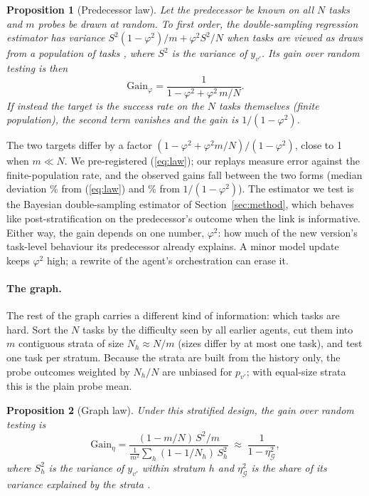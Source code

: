 \documentclass[11pt]{article}
\newtheorem{proposition}{Proposition}
\newcommand{\phisq}{\varphi^2}
\begin{document}
\begin{proposition}[Predecessor law]\label{prop:phi}
Let the predecessor be known on all $N$ tasks and $m$ probes be drawn at random. To first order, the double-sampling
regression estimator has variance $S^2(1-\phisq)/m + \phisq S^2/N$ when tasks are viewed as draws from a
population of tasks \citep[ch.~12]{cochran1977}, where $S^2$ is the variance of $y_{v'}$. Its gain over random
testing is then
\begin{equation}\label{eq:law}
\mathrm{Gain}_{\varphi} = \frac{1}{1-\phisq+\phisq\, m/N}.
\end{equation}
If instead the target is the success rate on the $N$ tasks themselves (finite population), the second term vanishes and
the gain is $1/(1-\phisq)$.
\end{proposition}
The two targets differ by a factor $(1-\phisq+\phisq m/N)/(1-\phisq)$, close to 1 when $m\ll N$. We pre-registered
(\ref{eq:law}); our replays measure error against the finite-population rate, and the observed gains fall between the two
forms (median deviation \LawBiasSuper\% from (\ref{eq:law}) and \LawBiasFinite\% from $1/(1-\phisq)$). The estimator we
test is the Bayesian double-sampling estimator of Section~\ref{sec:method}, which behaves like post-stratification on the
predecessor's outcome when the link is informative. Either way, the gain depends on one number, $\phisq$: how much of the
new version's task-level behaviour its predecessor already explains. A minor model update keeps $\phisq$ high; a rewrite
of the agent's orchestration can erase it.

\paragraph{The graph.} The rest of the graph carries a different kind of information: which tasks are hard. Sort the
$N$ tasks by the difficulty seen by all earlier agents, cut them into $m$ contiguous strata of size $N_h\approx
N/m$ (sizes differ by at most one task), and test one task per stratum. Because the strata are built from the history
only, the probe outcomes weighted by $N_h/N$ are unbiased for $p_{v'}$; with equal-size strata this is the plain
probe mean.

\begin{proposition}[Graph law]\label{prop:eta}
Under this stratified design, the gain over random testing is
\begin{equation}\label{eq:strat}
\mathrm{Gain}_{\eta} = \frac{(1-m/N)\,S^2/m}{\frac{1}{m^2}\sum_h (1-1/N_h)\,S_h^2}\;\approx\;\frac{1}{1-\eta^2_{\mathcal G}},
\end{equation}
where $S_h^2$ is the variance of $y_{v'}$ within stratum $h$ and $\eta^2_{\mathcal G}$ is the share of its variance
explained by the strata \citep[ch.~5]{cochran1977}.
\end{proposition}
\end{document}
